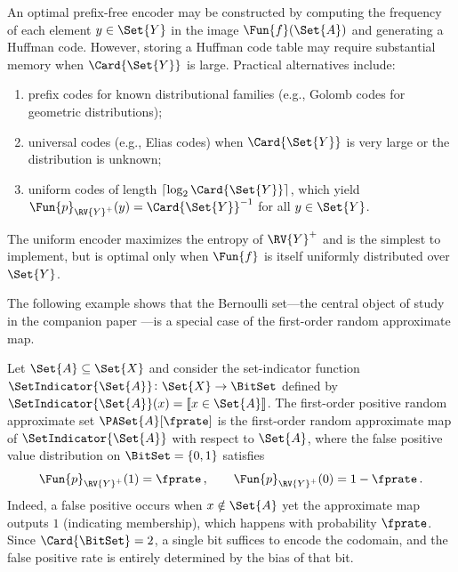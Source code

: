 \documentclass[ ../main.tex]{subfiles}
\begin{document}
\begin{remark}
An optimal prefix-free encoder may be constructed by computing the frequency
of each element $y \in \Set{Y}$ in the image $\Fun{f}(\Set{A})$ and generating
a Huffman code.
However, storing a Huffman code table may require substantial memory when
$\Card{\Set{Y}}$ is large.
Practical alternatives include:
\begin{enumerate}
    \item prefix codes for known distributional families (e.g., Golomb codes
          for geometric distributions);
    \item universal codes (e.g., Elias codes) when $\Card{\Set{Y}}$ is very
          large or the distribution is unknown;
    \item uniform codes of length $\lceil \log_2 \Card{\Set{Y}} \rceil$, which
          yield $\Fun{p}_{\RV{Y}^{+}}(y) = \Card{\Set{Y}}^{-1}$ for all
          $y \in \Set{Y}$.
\end{enumerate}
The uniform encoder maximizes the entropy of $\RV{Y}^{+}$ and is the simplest
to implement, but is optimal only when $\Fun{f}$ is itself uniformly
distributed over $\Set{Y}$.
\end{remark}

The following example shows that the Bernoulli set---the central object of
study in the companion paper \cite{aset}---is a special case of the first-order
random approximate map.

\begin{example}
\label{ex:aset_as_map}
Let $\Set{A} \subseteq \Set{X}$ and consider the set-indicator function
$\SetIndicator{\Set{A}} \colon \Set{X} \to \BitSet$ defined by
$\SetIndicator{\Set{A}}(x) = \llbracket x \in \Set{A} \rrbracket$.
The first-order positive random approximate set $\PASet{A}[\fprate]$ is the
first-order random approximate map of $\SetIndicator{\Set{A}}$ with respect to
$\Set{A}$, where the false positive value distribution on $\BitSet = \{0,1\}$
satisfies
\begin{equation}
    \Fun{p}_{\RV{Y}^{+}}(1) = \fprate\,,
    \qquad
    \Fun{p}_{\RV{Y}^{+}}(0) = 1 - \fprate\,.
\end{equation}
Indeed, a false positive occurs when $x \notin \Set{A}$ yet the approximate map
outputs $1$ (indicating membership), which happens with probability $\fprate$.
Since $\Card{\BitSet} = 2$, a single bit suffices to encode the codomain, and
the false positive rate is entirely determined by the bias of that bit.
\end{example}
\end{document}
